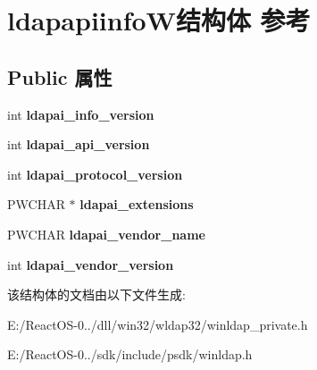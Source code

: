 \hypertarget{structldapapiinfo_w}{}\section{ldapapiinfo\+W结构体 参考}
\label{structldapapiinfo_w}
\subsection*{Public 属性}
\begin{DoxyCompactItemize}
\item 
\mbox{\label{structldapapiinfo_w_ad4875e51d6a59dc81a545eaa1676372b}} 
int {\bfseries ldapai\+\_\+info\+\_\+version}
\item 
\mbox{\label{structldapapiinfo_w_af7b93164f50393494cf51b21031e91f3}} 
int {\bfseries ldapai\+\_\+api\+\_\+version}
\item 
\mbox{\label{structldapapiinfo_w_af5d37b03f8eddce450ecb714e7729230}} 
int {\bfseries ldapai\+\_\+protocol\+\_\+version}
\item 
\mbox{\label{structldapapiinfo_w_aad9000abe24a4d54123f82f8a174f286}} 
P\+W\+C\+H\+AR $\ast$ {\bfseries ldapai\+\_\+extensions}
\item 
\mbox{\label{structldapapiinfo_w_a2f4612dc62f79e688bdfd9e5a36fdd3c}} 
P\+W\+C\+H\+AR {\bfseries ldapai\+\_\+vendor\+\_\+name}
\item 
\mbox{\label{structldapapiinfo_w_af26c73a4b21d9e177d012e33d70ec949}} 
int {\bfseries ldapai\+\_\+vendor\+\_\+version}
\end{DoxyCompactItemize}


该结构体的文档由以下文件生成\+:\begin{DoxyCompactItemize}
\item 
E\+:/\+React\+O\+S-\/0../dll/win32/wldap32/winldap\+\_\+private.\+h\item 
E\+:/\+React\+O\+S-\/0../sdk/include/psdk/winldap.\+h\end{DoxyCompactItemize}
